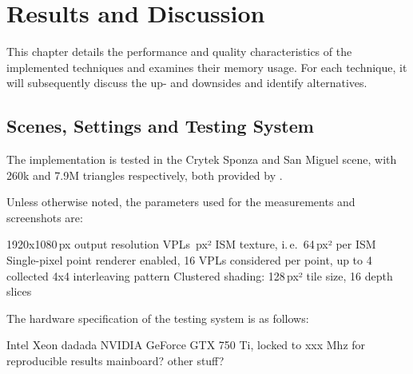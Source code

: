 

\chapter{Results and Discussion}
\label{chap:results}

This chapter details the performance and quality characteristics of the implemented techniques and  examines their memory usage. For each technique, it will subsequently discuss the up- and downsides and identify alternatives.

\section{Scenes, Settings and Testing System}
\label{sec:results:settings}

The implementation is tested in the Crytek Sponza and San Miguel scene, with 260k and 7.9M triangles respectively, both provided by \citet{McGuire2011Data}.


Unless otherwise noted, the parameters used for the measurements and screenshots are:
\begin{outline}
    \1 1920x1080\,px output resolution
     VPLs
    \,px² ISM texture, i.\,e.\ 64\,px² per ISM
    \1 Single-pixel point renderer enabled, 16 VPLs considered per point, up to 4 collected
    \1 4x4 interleaving pattern
    \1 Clustered shading: 128\,px² tile size, 16 depth slices
\end{outline}

\noindent
The hardware specification of the testing system is as follows:
\begin{outline}
    \1 Intel Xeon dadada
    \1 NVIDIA GeForce GTX 750 Ti, locked to xxx Mhz for reproducible results
    \1 mainboard?
    \1 other stuff?
\end{outline}



